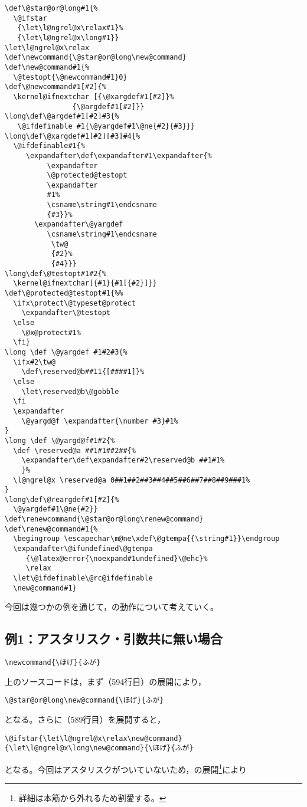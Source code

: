 \documentclass[autodetect-engine,dvipdfmx]{jsarticle}
\begin{document}
\latexltx
\begin{lstlisting}[firstnumber=589]
\def\@star@or@long#1{%
  \@ifstar
   {\let\l@ngrel@x\relax#1}%
   {\let\l@ngrel@x\long#1}}
\let\l@ngrel@x\relax
\def\newcommand{\@star@or@long\new@command}
\def\new@command#1{%
  \@testopt{\@newcommand#1}0}
\def\@newcommand#1[#2]{%
  \kernel@ifnextchar [{\@xargdef#1[#2]}%
                {\@argdef#1[#2]}}
\long\def\@argdef#1[#2]#3{%
   \@ifdefinable #1{\@yargdef#1\@ne{#2}{#3}}}
\long\def\@xargdef#1[#2][#3]#4{%
  \@ifdefinable#1{%
     \expandafter\def\expandafter#1\expandafter{%
          \expandafter
          \@protected@testopt
          \expandafter
          #1%
          \csname\string#1\endcsname
          {#3}}%
       \expandafter\@yargdef
          \csname\string#1\endcsname
           \tw@
           {#2}%
           {#4}}}
\long\def\@testopt#1#2{%
  \kernel@ifnextchar[{#1}{#1[{#2}]}}
\def\@protected@testopt#1{%%
  \ifx\protect\@typeset@protect
    \expandafter\@testopt
  \else
    \@x@protect#1%
  \fi}
\long \def \@yargdef #1#2#3{%
  \ifx#2\tw@
    \def\reserved@b##11{[####1]}%
  \else
    \let\reserved@b\@gobble
  \fi
  \expandafter
    \@yargd@f \expandafter{\number #3}#1%
}
\long \def \@yargd@f#1#2{%
  \def \reserved@a ##1#1##2##{%
    \expandafter\def\expandafter#2\reserved@b ##1#1%
    }%
  \l@ngrel@x \reserved@a 0##1##2##3##4##5##6##7##8##9###1%
}
\long\def\@reargdef#1[#2]{%
  \@yargdef#1\@ne{#2}}
\def\renewcommand{\@star@or@long\renew@command}
\def\renew@command#1{%
  \begingroup \escapechar\m@ne\xdef\@gtempa{{\string#1}}\endgroup
  \expandafter\@ifundefined\@gtempa
     {\@latex@error{\noexpand#1undefined}\@ehc}%
     \relax
  \let\@ifdefinable\@rc@ifdefinable
  \new@command#1}
\end{lstlisting}

今回は幾つかの例を通じて，の動作について考えていく。

\subsection{例1：アスタリスク・引数共に無い場合}

\texsource
\begin{lstlisting}
\newcommand{\ほげ}{ふが}
\end{lstlisting}

上のソースコードは，まず（594行目）の展開により，
\begin{lstlisting}
\@star@or@long\new@command{\ほげ}{ふが}
\end{lstlisting}
となる。さらに（589行目）を展開すると，
\begin{lstlisting}
\@ifstar{\let\l@ngrel@x\relax\new@command}{\let\l@ngrel@x\long\new@command}{\ほげ}{ふが}
\end{lstlisting}
となる。今回はアスタリスクがついていないため，の展開\footnote{詳細は本筋から外れるため割愛する。}により
\end{document}

